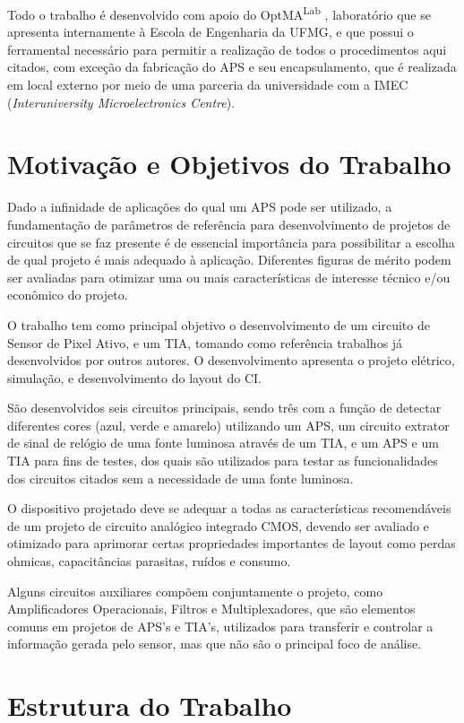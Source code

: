 Todo o trabalho é desenvolvido com apoio do OptMA\textsuperscript{Lab} , laboratório que se apresenta internamente à Escola de Engenharia da UFMG, e que possui o ferramental necessário para permitir a realização de todos o procedimentos aqui citados, com exceção da fabricação do APS e seu encapsulamento, que é realizada em local externo por meio de uma parceria da universidade com a IMEC (\textit{Interuniversity Microelectronics Centre}).

\section{Motivação e Objetivos do Trabalho}

Dado a infinidade de aplicações do qual um APS pode ser utilizado, a fundamentação de parâmetros de referência para desenvolvimento de projetos de circuitos que se faz presente é de essencial importância para possibilitar a escolha de qual projeto é mais adequado à aplicação. Diferentes figuras de mérito podem ser avaliadas para otimizar uma ou mais características de interesse técnico e/ou econômico do projeto.

O trabalho tem como principal objetivo o desenvolvimento de um circuito de Sensor de Pixel Ativo, e um TIA, tomando como referência trabalhos j\'a desenvolvidos por outros autores. O desenvolvimento apresenta o projeto elétrico, simulação, e desenvolvimento do layout do CI. 

São desenvolvidos seis circuitos principais, sendo três com a função de detectar diferentes cores (azul, verde e amarelo) utilizando um APS, um circuito extrator de sinal de relógio de uma fonte luminosa atrav\'es de um TIA, e um APS e um TIA para fins de testes, dos quais são utilizados para testar as funcionalidades dos circuitos citados sem a necessidade de uma fonte luminosa. 

O dispositivo projetado deve se adequar a todas as características recomendáveis de um projeto de circuito analógico integrado CMOS, devendo ser avaliado e otimizado para aprimorar certas propriedades importantes de layout como perdas ohmicas, capacitâncias parasitas, ruídos e consumo.

Alguns circuitos auxiliares compõem conjuntamente o projeto, como Amplificadores Operacionais, Filtros e Multiplexadores, que são elementos comuns em projetos de APS’s e TIA's, utilizados para transferir e controlar a informação gerada pelo sensor, mas que não são o principal foco de análise.

\section{Estrutura do Trabalho}

